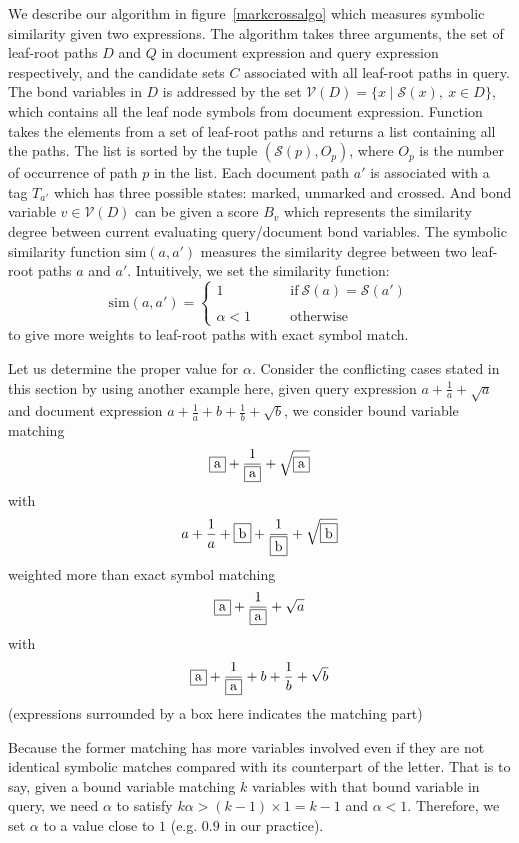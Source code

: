 \documentclass{acm_proc_article-sp}
\begin{document}
We describe our algorithm in figure~\ref{markcrossalgo} which measures symbolic similarity given two expressions. 
The  algorithm takes 
three arguments, the set of leaf-root paths $D$ and $Q$ in document expression and query expression respectively, and the candidate sets $C$ associated with all leaf-root paths in query. 
The bond variables in $D$ is addressed by the set $\mathcal{V}(D) = \{x \mid \mathcal{S}(x),\ x \in D\}$, which contains all the leaf node symbols from document expression.
Function  takes the elements from a set of leaf-root paths and returns a list containing all the paths. 
The list is sorted by the tuple $(\mathcal{S}(p), O_p)$, where $O_p$ is the number of occurrence of path $p$ in the list. 
Each document path $a'$ is associated with a tag $T_{a'}$ which has three possible states: marked, unmarked and crossed. And bond variable $v \in \mathcal{V}(D)$ can be given a score $B_v$ which represents the similarity degree between current evaluating query/document bond variables. 
The symbolic similarity function $\mathrm{sim}(a,a')$ measures the similarity degree between two leaf-root paths $a$ and $a'$. 
Intuitively, we set the similarity function:
$$
\mathrm{sim}(a,a') = 
\left\{
\begin{array}{ll}
1    &\qquad \mathrm{if}\  \mathcal{S}(a) = \mathcal{S}(a')
\\
\\
\alpha < 1  &\qquad \mathrm{otherwise}
\end{array}
\right.
$$
to give more weights to leaf-root paths with exact symbol match.

Let us determine the proper value for $\alpha$. 
Consider the conflicting cases stated in this section by using another example here, 
given query expression $a+\frac 1 a + \sqrt{a}$ and document expression $a+\frac 1 a + b + \frac 1 b + \sqrt{b}$, we consider bound variable matching 
$$\fbox{a}+\dfrac 1 {\fbox{a}} + \sqrt{\fbox{a}}$$
with 
$$a+\dfrac 1 a + \fbox{b} + \dfrac 1 {\fbox{b}} + \sqrt{\fbox{b}}$$
weighted more than exact symbol matching 
$$\fbox{a}+\dfrac 1 {\fbox{a}} + \sqrt{a}$$ 
with 
$$\fbox{a}+\dfrac 1 {\fbox{a}} + b + \dfrac 1 b + \sqrt{b}$$
(expressions surrounded by a box here indicates the matching part)

Because the former matching has more variables involved even if they are not identical symbolic matches compared with its counterpart of the letter. 
That is to say, given a bound variable matching $k$ variables with that bound variable in query, we need $\alpha$ to satisfy $ k \alpha > (k-1) \times 1 = k - 1 $
and $\alpha < 1$. 
Therefore, we set $\alpha$ to a value close to $1$ (e.g. $0.9$ in our practice).
\end{document}
